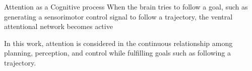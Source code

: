 \begin{frame}[allowframebreaks]{Attention as a Cognitive process}
    When the brain tries to follow a goal, such as generating a sensorimotor control signal to follow a trajectory, the ventral attentional network becomes active\cite{scalf-2014-trial-history-effects-in-the-ventral-attentional-network}
    
    In this work, attention is considered in the continuous relationship among planning, perception, and control while fulfilling goals such as following a trajectory.
\end{frame}